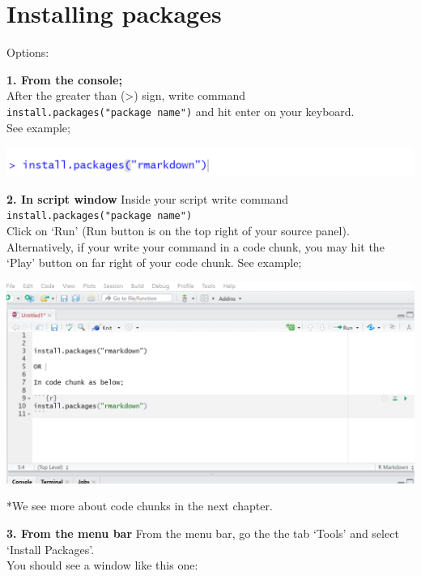 \documentclass[
]{book}
\let\origfigure\figure
\let\endorigfigure\endfigure
\renewenvironment{figure}[1][2] {
    \expandafter\origfigure\expandafter[H]
} {
    \endorigfigure
}
\begin{document}
\hypertarget{installing-packages}{%
\section{Installing packages}\label{installing-packages}}

Options:

\textbf{1. From the console;}\\
After the greater than (\textgreater) sign, write command \texttt{install.packages("package\ name")} and hit enter on your keyboard.\\
See example;

\begin{figure}
\centering
\includegraphics{tutorial_screenshots/install_rmkdn_console.png}
\caption{install packages from console}
\end{figure}

\textbf{2. In script window }
Inside your script write command \texttt{install.packages("package\ name")}\\
Click on `Run' (Run button is on the top right of your source panel).\\
Alternatively, if your write your command in a code chunk, you may hit the `Play' button on far right of your code chunk. See example;

\begin{figure}
\centering
\includegraphics{tutorial_screenshots/install_rmkdn_scrpt.png}
\caption{install packages from script wnindow}
\end{figure}

*We see more about code chunks in the next chapter.

\textbf{3. From the menu bar }
From the menu bar, go the the tab `Tools' and select `Install Packages'.\\
You should see a window like this one:
\end{document}
